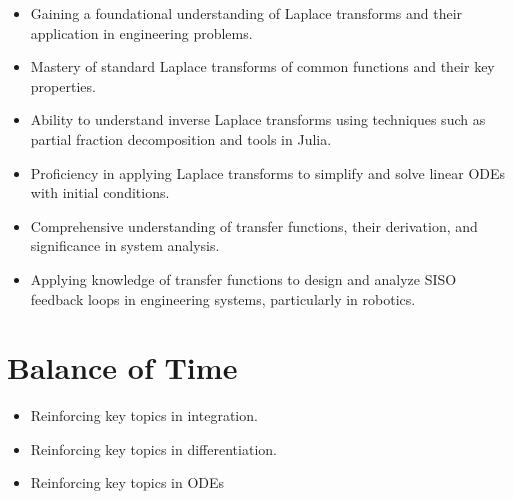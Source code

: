 \documentclass[letterpaper]{book}
\begin{document}
\begin{enumerate}[label={\large\arabic*}, font=\large]
\begin{itemize}
    \item Gaining a foundational understanding of Laplace transforms and their application in engineering problems.
    \item Mastery of standard Laplace transforms of common functions and their key properties.
    \item Ability to understand inverse Laplace transforms using techniques such as partial fraction decomposition and tools in Julia.
    \item Proficiency in applying Laplace transforms to simplify and solve linear ODEs with initial conditions.
    \item Comprehensive understanding of transfer functions, their derivation, and significance in system analysis.
    \item Applying knowledge of transfer functions to design and analyze SISO feedback loops in engineering systems, particularly in robotics.
\end{itemize}

\end{enumerate}

\section*{Balance of Time}
\begin{itemize}
    \item Reinforcing key topics in integration.
    \item Reinforcing key topics in differentiation.
    \item Reinforcing key topics in ODEs
\end{itemize}
\end{document}
